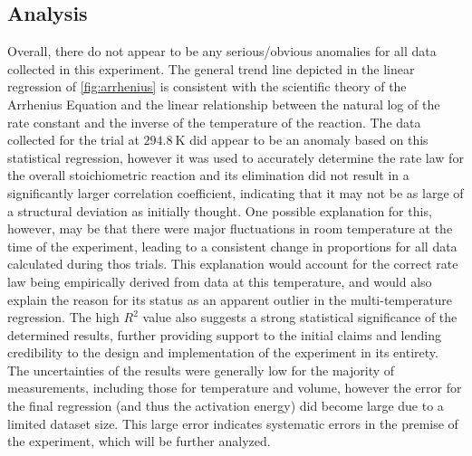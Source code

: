 \subsection{Analysis}
Overall, there do not appear to be any serious/obvious anomalies for all data collected in this experiment. The general trend line depicted in the linear regression of \cref{fig:arrhenius} is consistent with the scientific theory of the Arrhenius Equation and the linear relationship between the natural log of the rate constant and the inverse of the temperature of the reaction. The data collected for the trial at $\SI{294.8}{\kelvin}$ did appear to be an anomaly based on this statistical regression, however it was used to accurately determine the rate law for the overall stoichiometric reaction and its elimination did not result in a significantly larger correlation coefficient, indicating that it may not be as large of a structural deviation as initially thought. One possible explanation for this, however, may be that there were major fluctuations in room temperature at the time of the experiment, leading to a consistent change in proportions for all data calculated during thos trials. This explanation would account for the correct rate law being empirically derived from data at this temperature, and would also explain the reason for its status as an apparent outlier in the multi-temperature regression. The high $R^2$ value also suggests a strong statistical significance of the determined results, further providing support to the initial claims and lending credibility to the design and implementation of the experiment in its entirety. The uncertainties of the results were generally low for the majority of measurements, including those for temperature and volume, however the error for the final regression (and thus the activation energy) did become large due to a limited dataset size. This large error indicates systematic errors in the premise of the experiment, which will be further analyzed. 
